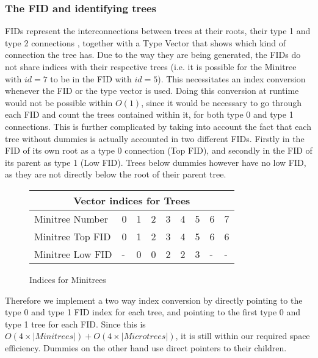 \documentclass{article}
\begin{document}
\subsubsection{The FID and identifying trees}
FIDs represent the interconnections between trees at their roots, their type 1 and type 2 connections \cite{farzanMunro}, together with a Type Vector that shows which kind of connection the tree has.
Due to the way they are being generated, the FIDs do not share indices with their respective trees (i.e. it is possible for the Minitree with $id = 7$ to be in the FID with $id = 5$).
This necessitates an index conversion whenever the FID or the type vector is used. Doing this conversion at runtime would not be possible within $O(1)$, since it would be necessary to go through each FID and count the trees contained within it, for both type 0 and type 1 connections.
This is further complicated by taking into account the fact that each tree without dummies is actually accounted in two different FIDs. Firstly in the FID of its own root as a type 0 connection (Top FID), and secondly in the FID of its parent as type 1 (Low FID). Trees below dummies however have no low FID, as they are not directly below the root of their parent tree.
\begin{figure}[h]
	\begin{tabular}{ |p{3.5cm}||p{0.5cm}|p{0.5cm}|p{0.5cm}|p{0.5cm}|p{0.5cm}|p{0.5cm}|p{0.5cm}|p{0.5cm}|  }
		 \hline
		 \multicolumn{9}{|c|}{Vector indices for Trees} \\
		 \hline
		 Minitree Number & 0 & 1& 2 & 3 & 4 & 5 & 6 & 7\\
		 Minitree Top FID& 0 & 1 & 2 & 3 & 4 & 5 & 6 & 6\\
		 Minitree Low FID& - & 0 & 0 & 2 & 2 & 3 & - & -\\
		 \hline
	\end{tabular}
\caption{Indices for Minitrees}
\label{fid:table1}
\end{figure}
Therefore we implement a two way index conversion by directly pointing to the type 0 and type 1 FID index for each tree, and pointing to the first type 0 and type 1 tree for each FID. Since this is $O(4 \times |Minitrees|) + O(4 \times |Microtrees|)$, it is still within our required space efficiency. Dummies on the other hand use direct pointers to their children.\\
\end{document}

